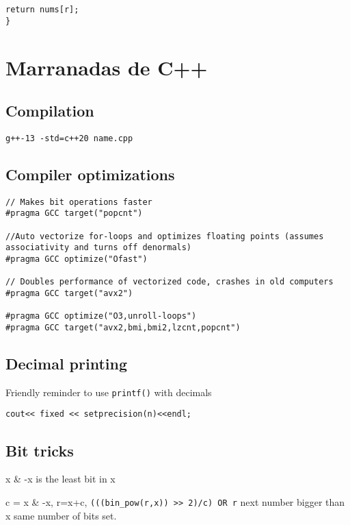 \documentclass[10pt]{article}
\begin{document}
\begin{multicols*}{2}
\begin{lstlisting}[style=compactcpp]
    return nums[r];
}
\end{lstlisting}

\section{Marranadas de C++}

\subsection{Compilation}

\texttt{g++-13 -std=c++20 name.cpp}

\subsection{Compiler optimizations}


\begin{lstlisting}[style=compactcpp]
// Makes bit operations faster
#pragma GCC target("popcnt") 

//Auto vectorize for-loops and optimizes floating points (assumes associativity and turns off denormals)
#pragma GCC optimize("Ofast")

// Doubles performance of vectorized code, crashes in old computers
#pragma GCC target("avx2")

#pragma GCC optimize("O3,unroll-loops")
#pragma GCC target("avx2,bmi,bmi2,lzcnt,popcnt")
\end{lstlisting}

\subsection{Decimal printing}

Friendly reminder to use \texttt{printf()} with decimals

\begin{lstlisting}[style=compactcpp]
cout<< fixed << setprecision(n)<<endl;
\end{lstlisting}

\subsection{Bit tricks}

x \& -x is the least bit in x

c = x \& -x, r=x+c, \texttt{(((bin\_pow(r,x)) >> 2)/c) OR r}  next number bigger than x same number of bits set.

\end{multicols*}
\end{document}
